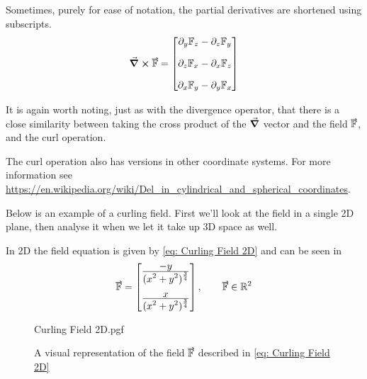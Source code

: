 \documentclass[main.tex]{subfiles}
\begin{document}
                    Sometimes, purely for ease of notation, the partial derivatives are shortened using subscripts.
                    \begin{equation*}
                        \curl{\vect{\mathbb{F}}} = \Matrix{\partial_y \mathbb{F}_z - \partial_z \mathbb{F}_y\\[1em] \partial_z \mathbb{F}_x - \partial_x \mathbb{F}_z\\[1em] \partial_x \mathbb{F}_y - \partial_y \mathbb{F}_x}
                    \end{equation*}

                    It is again worth noting, just as with the divergence operator, that there is a close similarity between taking the cross product of the $\grad{}$ vector and the field $\vect{\mathbb{F}}$, and the curl operation.

                    The curl operation also has versions in other coordinate systems. For more information see \url{https://en.wikipedia.org/wiki/Del_in_cylindrical_and_spherical_coordinates}.


                    \newpage
                    Below is an example of a curling field. First we'll look at the field in a single 2D plane, then analyse it when we let it take up 3D space as well.

                    In 2D the field equation is given by \eqref{eq: Curling Field 2D} and can be seen in 
                    \begin{equation}
                        \vect{\mathbb{F}} = \Matrix{\bfrac{-y}{(x^2 + y^2)^\frac{3}{4}}\\[1.5em] \bfrac{x}{(x^2 + y^2)^\frac{3}{4}}}, \hspace{2em} \vect{\mathbb{F}} \in \Reals^2
                        \label{eq: Curling Field 2D}
                    \end{equation}

                    \begin{figure}[h]
                        \centering
                        \scalebox{0.95}
                        {
                            \begin{adjustbox}{clip,trim=10mm 10mm 10mm 10mm}
                                {{Curling Field 2D.pgf}}
                            \end{adjustbox}
                        }
                        \vspace{-1em}
                        \caption{A visual representation of the field $\protect\vect{\mathbb{F}}$ described in \eqref{eq: Curling Field 2D}}
                        \label{fig: Curling 2D Field}
                    \end{figure}
                    \FloatBarrier
                    \vspace{2em}
\end{document}
